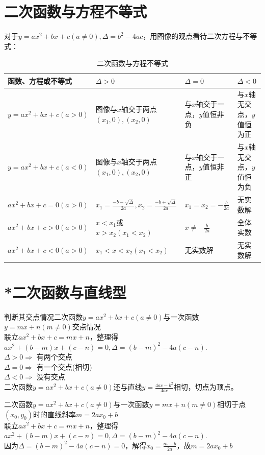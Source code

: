\section{二次函数与方程不等式}
\begin{theorem}
    对于$y=ax^2+bx+c(a\ne 0),\Delta = b^2-4ac$，用图像的观点看待二次方程与不等式：
\end{theorem}
\begin{table}[H]
    \centering
    \caption{二次函数与方程不等式}
    \begin{tabular}{l|p{5cm}|p{3cm}|p{2.8cm}}
        \hline
        \hline
        函数、方程或不等式          & $\Delta > 0 $                                                 & $\Delta = 0 $           & $\Delta < 0 $    \\
        \hline
        $y=ax^2+bx+c(a>0)$ & 图像与$x$轴交于两点$(x_1,0),(x_2,0)$                                  & 与$x$轴交于一点，$y$值恒非负       & 与$x$轴无交点，$y$值恒为正 \\
        $y=ax^2+bx+c(a<0)$ & 图像与$x$轴交于两点$(x_1,0),(x_2,0)$                                  & 与$x$轴交于一点，$y$值恒非正       & 与$x$轴无交点，$y$值恒为负 \\
        $ax^2+bx+c=0(a>0)$ & $x_1=\frac{-b-\sqrt\Delta}{2a},x_2=\frac{-b+\sqrt\Delta}{2a}$ & $x_1=x_2=-\frac{b}{2a}$ & 无实数解             \\
        $ax^2+bx+c>0(a>0)$ & $x<x_1$或$x>x_2(x_1<x_2)$                                      & $x \ne -\frac{b}{2a}$   & 全体实数             \\
        $ax^2+bx+c<0(a>0)$ & $x_1<x<x_2(x_1<x_2)$                                          & 无实数解                    & 无实数解             \\
        \hline
        \hline
    \end{tabular}
\end{table}
\clearpage
\section{*二次函数与直线型}
\begin{theorem}
    判断其交点情况二次函数$y=ax^2+bx+c(a \ne 0)$与一次函数$y=mx+n(m \ne 0)$交点情况 \\
    联立$ax^2+bx+c=mx+n$，整理得$ax^2+(b-m)x+(c-n)=0,\Delta=(b-m)^2-4a(c-n)$. \\
    $\Delta > 0 \Rightarrow$ 有两个交点 \\
    $\Delta = 0 \Rightarrow$ 有一个交点(相切) \\
    $\Delta < 0 \Rightarrow$ 没有交点 \\
    二次函数$y=ax^2+bx+c(a \ne 0)$还与直线$y=\frac{4ac-b^2}{4ac}$相切，切点为顶点。
\end{theorem}
\begin{theorem}
    二次函数$y=ax^2+bx+c(a \ne 0)$与一次函数$y=mx+n(m \ne 0)$相切于点$(x_0,y_0)$时的直线斜率$m=2ax_0+b$ \\
    联立$ax^2+bx+c=mx+n$，整理得$ax^2+(b-m)x+(c-n)=0,\Delta=(b-m)^2-4a(c-n)$. \\
    因为$\Delta=(b-m)^2-4a(c-n)=0$，解得$x_0=\frac{m-b}{2a}$，故$m=2ax_0+b$ \\
\end{theorem}
\clearpage
